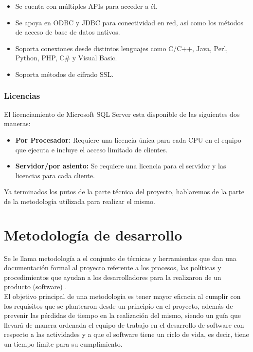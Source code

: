 			\begin{itemize}
				\item Se cuenta con m\'ultiples APIs para acceder a \'el.
				\item Se apoya en ODBC y JDBC para conectividad en red, as\'i como los m\'etodos de acceso de base de datos nativos.
				\item Soporta conexiones desde distintos lenguajes como C/C++, Java, Perl, Python, PHP, C\# y Visual Basic.
				\item Soporta m\'etodos de cifrado SSL.
			\end{itemize}

		\subsubsection{Licencias}

			El licenciamiento de Microsoft SQL Server esta disponible de las siguientes dos maneras:
			\begin{itemize}
				\item \textbf{Por Procesador:} Requiere una licencia \'unica para cada CPU en el equipo que ejecuta e incluye el acceso limitado de clientes.
				\item \textbf{Servidor/por asiento:} Se requiere una licencia para el servidor y las licencias para cada cliente.
			\end{itemize}

	Ya terminados los putos de la parte técnica del proyecto, hablaremos de la parte de la metodología utilizada para realizar el mismo.

\section{Metodolog\'ia de desarrollo}

	Se le llama metodolog\'ia a el conjunto de t\'ecnicas y herramientas que dan una documentaci\'on formal al proyecto referente a los procesos, las pol\'iticas y procedimientos que ayudan a los desarrolladores para la realizaron de un producto (software) .\\

	El objetivo principal de una metodolog\'ia es tener mayor eficacia al cumplir con los requisitos que se plantearon desde un principio en el proyecto, adem\'as  de prevenir las p\'erdidas de tiempo en la realizaci\'on del mismo, siendo un guía que llevar\'a de manera ordenada el equipo de trabajo en el desarrollo de software con respecto a las actividades y a que el software tiene un ciclo de vida, es decir, tiene un tiempo l\'imite para su cumplimiento.\\

